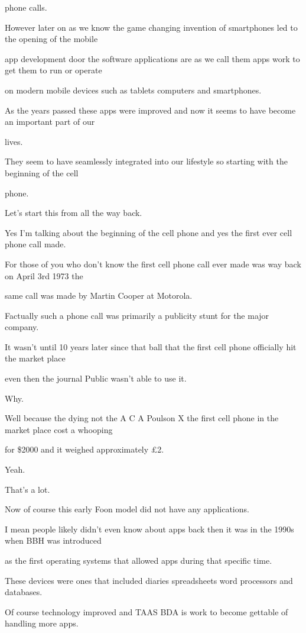 phone calls.

However later on as we know the game changing invention of smartphones led to the opening of the mobile

app development door the software applications are as we call them apps work to get them to run or operate

on modern mobile devices such as tablets computers and smartphones.

As the years passed these apps were improved and now it seems to have become an important part of our

lives.

They seem to have seamlessly integrated into our lifestyle so starting with the beginning of the cell

phone.

Let's start this from all the way back.

Yes I'm talking about the beginning of the cell phone and yes the first ever cell phone call made.

For those of you who don't know the first cell phone call ever made was way back on April 3rd 1973 the

same call was made by Martin Cooper at Motorola.

Factually such a phone call was primarily a publicity stunt for the major company.

It wasn't until 10 years later since that ball that the first cell phone officially hit the market place

even then the journal Public wasn't able to use it.

Why.

Well because the dying not the A C A Poulson X the first cell phone in the market place cost a whooping

for \$2000 and it weighed approximately £2.

Yeah.

That's a lot.

Now of course this early Foon model did not have any applications.

I mean people likely didn't even know about apps back then it was in the 1990s when BBH was introduced

as the first operating systems that allowed apps during that specific time.

These devices were ones that included diaries spreadsheets word processors and databases.

Of course technology improved and TAAS BDA is work to become gettable of handling more apps.

